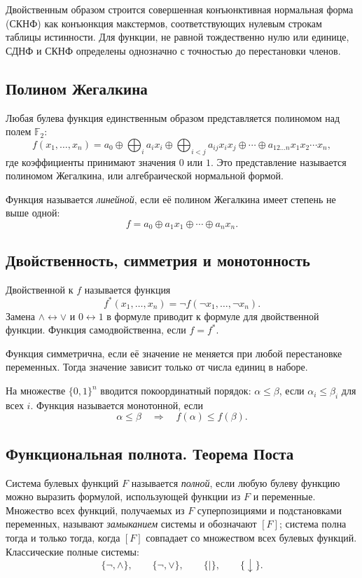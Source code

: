 Двойственным образом строится совершенная конъюнктивная нормальная форма (СКНФ)
как конъюнкция макстермов, соответствующих нулевым строкам таблицы истинности.
Для функции, не равной тождественно нулю или единице, СДНФ и СКНФ определены
однозначно с точностью до перестановки членов.

\subsection{Полином Жегалкина}

Любая булева функция единственным образом представляется полиномом над полем
$\mathbb{F}_2$:
\[
 f(x_1,\ldots,x_n)=
 a_0\oplus
 \bigoplus_i a_i x_i\oplus
 \bigoplus_{i<j}a_{ij}x_ix_j\oplus\cdots\oplus
 a_{12\ldots n}x_1x_2\cdots x_n,
\]
где коэффициенты принимают значения $0$ или $1$. Это представление называется
полиномом Жегалкина, или алгебраической нормальной формой.

Функция называется \emph{линейной}, если её полином Жегалкина имеет степень не выше
одной:
\[
    f=a_0\oplus a_1x_1\oplus\cdots\oplus a_nx_n.
\]

\subsection{Двойственность, симметрия и монотонность}

Двойственной к $f$ называется функция
\[
    f^*(x_1,\ldots,x_n)=\neg f(\neg x_1,\ldots,\neg x_n).
\]
Замена $\land\leftrightarrow\lor$ и $0\leftrightarrow1$ в формуле приводит к
формуле для двойственной функции. Функция самодвойственна, если $f=f^*$.

Функция симметрична, если её значение не меняется при любой перестановке
переменных. Тогда значение зависит только от числа единиц в наборе.

На множестве $\{0,1\}^n$ вводится покоординатный порядок:
$\alpha\leq\beta$, если $\alpha_i\leq\beta_i$ для всех $i$.
Функция называется монотонной, если
\[
    \alpha\leq\beta\quad\Longrightarrow\quad f(\alpha)\leq f(\beta).
\]

\subsection{Функциональная полнота. Теорема Поста}

Система булевых функций $F$ называется \emph{полной}, если любую булеву функцию
можно выразить формулой, использующей функции из $F$ и переменные. Множество
всех функций, получаемых из $F$ суперпозициями и подстановками переменных,
называют \emph{замыканием} системы и обозначают $[F]$; система полна тогда и
только тогда, когда $[F]$ совпадает со множеством всех булевых функций.
Классические полные системы:
\[
    \{\neg,\land\},\qquad \{\neg,\lor\},\qquad
    \{\mid\},\qquad \{\downarrow\}.
\]

